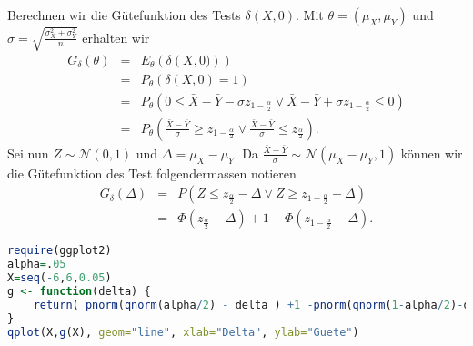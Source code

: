 Berechnen wir die Gütefunktion des Tests $\delta\left( X,0 \right)$. Mit $\theta=\left( \mu_X,\mu_Y \right)$
und $\sigma= \sqrt{\frac{\sigma_X^2 + \sigma_Y^2}{n}}$ erhalten wir
\begin{eqnarray*}
    G_\delta(\theta) &=&  E_\theta \left( \delta \left( X,0) \right)  \right) \\
    &=& P_\theta \left( \delta(X,0) = 1 \right) \\
    &=& P_\theta \left( 0 \leq \bar X - \bar Y - \sigma z_{1-\frac{\alpha}{2}} \vee
        \bar X - \bar Y + \sigma z_{1-\frac{\alpha}{2}} \leq 0\right) \\
    &=& P_\theta \left( \frac{\bar X - \bar Y}{\sigma} \geq z_{1-\frac{\alpha}{2}} \vee
    \frac{\bar X - \bar Y}{\sigma} \leq z_{\frac{\alpha}{2}}\right).
\end{eqnarray*}
Sei nun $Z\sim\mathcal N(0,1)$ und $\Delta=\mu_X - \mu_Y$. 
Da $\frac{\bar X -\bar Y}{\sigma}\sim \mathcal N(\mu_X-\mu_Y,1)$ können wir die Gütefunktion des 
Test folgendermassen notieren
\begin{eqnarray*}
    G_\delta (\Delta) &=& P \left( Z \leq z_{\frac{\alpha}{2}} -\Delta \vee
    Z \geq z_{1-\frac{\alpha}{2}} -\Delta \right)  \\
    &=& \Phi\left( z_{\frac{\alpha}{2}} - \Delta\right) 
    + 1 - \Phi\left( z_{1-\frac{\alpha}{2}} -\Delta \right). 
\end{eqnarray*}




\begin{lstlisting}[language=R,caption={R Code zum Plotten der Gütefunktion}]
require(ggplot2)
alpha=.05
X=seq(-6,6,0.05)
g <- function(delta) {
    return( pnorm(qnorm(alpha/2) - delta ) +1 -pnorm(qnorm(1-alpha/2)-delta))  
}
qplot(X,g(X), geom="line", xlab="Delta", ylab="Guete")
\end{lstlisting}







